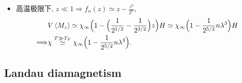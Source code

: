 \begin{itemize}
\begin{itemize}
		\item 高温极限下, $z \ll 1 \Longrightarrow f_n(z) \simeq z - \frac{z^2}{2^n}$,
		\begin{align}
			& V \braket{M_z} \simeq \chi_\infty \Big( 1 - \Big( \frac{1}{2^{1 / 2}} - \frac{1}{2^{3 / 2}} \Big) z \Big) H \simeq \chi_\infty \Big( 1 - \frac{1}{2^{5 / 2}} n \lambda^3 \Big) H \notag \\
			\Longrightarrow & \chi \overset{T \gg T_F}{\simeq} \chi_\infty \Big( 1 - \frac{1}{2^{5 / 2}} n \lambda^3 \Big).
		\end{align}
	\end{itemize}
\end{itemize}

\subsection{Landau diamagnetism}
